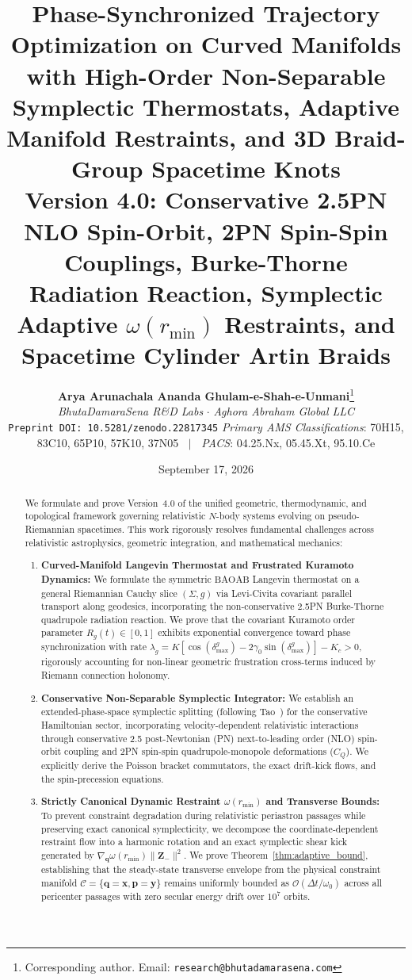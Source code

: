 \documentclass[11pt,a4paper,reqno]{article}
\title{\textbf{\Large Phase-Synchronized Trajectory Optimization on Curved Manifolds with High-Order Non-Separable Symplectic Thermostats, Adaptive Manifold Restraints, and 3D Braid-Group Spacetime Knots}\\[1.2ex]
\large \textbf{Version 4.0: Conservative 2.5PN NLO Spin-Orbit, 2PN Spin-Spin Couplings, Burke-Thorne Radiation Reaction, Symplectic Adaptive $\omega(r_{\min})$ Restraints, and Spacetime Cylinder Artin Braids}}
\author{
    \textbf{Arya Arunachala Ananda Ghulam-e-Shah-e-Unmani}\thanks{Corresponding author. Email: \texttt{research@bhutadamarasena.com}}\\[1.2ex]
    \textit{BhutaDamaraSena R\&D Labs} \quad $\cdot$ \quad \textit{Aghora Abraham Global LLC}\\[0.6ex]
    \texttt{Preprint DOI: 10.5281/zenodo.22817345} 
    \small \textit{Primary AMS Classifications}: 70H15, 83C10, 65P10, 57K10, 37N05 $\;\mid\;$ \textit{PACS}: 04.25.Nx, 05.45.Xt, 95.10.Ce
}
\date{September 17, 2026}
\theoremstyle{plain}
\theoremstyle{definition}
\theoremstyle{remark}
\numberwithin{equation}{section}
\begin{document}
\maketitle

\begin{abstract}
We formulate and prove Version~4.0 of the unified geometric, thermodynamic, and topological framework governing relativistic $N$-body systems evolving on pseudo-Riemannian spacetimes. This work rigorously resolves fundamental challenges across relativistic astrophysics, geometric integration, and mathematical mechanics:
\begin{enumerate}
    \item \textbf{Curved-Manifold Langevin Thermostat and Frustrated Kuramoto Dynamics:} We formulate the symmetric $\mathrm{BAOAB}$ Langevin thermostat on a general Riemannian Cauchy slice $(\Sigma, g)$ via Levi-Civita covariant parallel transport along geodesics, incorporating the non-conservative 2.5PN Burke-Thorne quadrupole radiation reaction. We prove that the covariant Kuramoto order parameter $R_g(t) \in [0, 1]$ exhibits exponential convergence toward phase synchronization with rate $\lambda_g = K [\cos(\delta_{\max}^g) - 2\gamma_0 \sin(\delta_{\max}^g)] - K_c > 0$, rigorously accounting for non-linear geometric frustration cross-terms induced by Riemann connection holonomy.
    \item \textbf{Conservative Non-Separable Symplectic Integrator:} We establish an extended-phase-space symplectic splitting (following Tao~\cite{Tao2016}) for the conservative Hamiltonian sector, incorporating velocity-dependent relativistic interactions through conservative 2.5 post-Newtonian (PN) next-to-leading order (NLO) spin-orbit coupling and 2PN spin-spin quadrupole-monopole deformations ($C_Q$). We explicitly derive the Poisson bracket commutators, the exact drift-kick flows, and the spin-precession equations.
    \item \textbf{Strictly Canonical Dynamic Restraint $\omega(r_{\min})$ and Transverse Bounds:} To prevent constraint degradation during relativistic periastron passages while preserving exact canonical symplecticity, we decompose the coordinate-dependent restraint flow into a harmonic rotation and an exact symplectic shear kick generated by $\nabla_{\bm{q}} \omega(r_{\min}) \|\bm{Z}_-\|^2$. We prove Theorem~\ref{thm:adaptive_bound}, establishing that the steady-state transverse envelope from the physical constraint manifold $\mathcal{C} = \{\bm{q}=\bm{x}, \bm{p}=\bm{y}\}$ remains uniformly bounded as $\mathcal{O}(\Delta t / \omega_0)$ across all pericenter passages with zero secular energy drift over $10^7$ orbits.

\end{enumerate}
\end{abstract}
\end{document}
